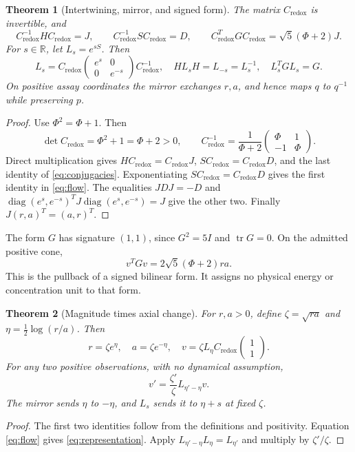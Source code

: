 \documentclass[11pt]{article}
\newtheorem{theorem}{Theorem}
\newcommand{\R}{\mathbb R}
\newcommand{\Id}{I}
\newcommand{\Cr}{C_{\mathrm{redox}}}
\begin{document}
\begin{theorem}[Intertwining, mirror, and signed form]\label{thm:adapter}
The matrix \(\Cr\) is invertible, and
\begin{equation}\label{eq:conjugacies}
 \Cr^{-1}H\Cr=J,\qquad \Cr^{-1}S\Cr=D,\qquad
 \Cr^{T}G\Cr=\sqrt5(\Phi+2)J.
\end{equation}
For \(s\in\R\), let \(L_s=e^{sS}\). Then
\begin{equation}\label{eq:flow}
 L_s=\Cr\begin{pmatrix}e^s&0\\0&e^{-s}\end{pmatrix}\Cr^{-1},
 \quad HL_sH=L_{-s}=L_s^{-1},\quad L_s^TGL_s=G.
\end{equation}
On positive assay coordinates the mirror exchanges \(r,a\), and hence
maps \(q\) to \(q^{-1}\) while preserving \(p\).
\end{theorem}
\begin{proof}
Use \(\Phi^2=\Phi+1\). Then
\[
 \det\Cr=\Phi^2+1=\Phi+2>0,\qquad
 \Cr^{-1}=\frac1{\Phi+2}
   \begin{pmatrix}\Phi&1\\-1&\Phi\end{pmatrix}.
\]
Direct multiplication gives \(H\Cr=\Cr J\), \(S\Cr=\Cr D\),
and the last identity of \eqref{eq:conjugacies}.
Exponentiating \(S\Cr=\Cr D\) gives the first identity in
\eqref{eq:flow}. The equalities \(JDJ=-D\) and
\(\operatorname{diag}(e^s,e^{-s})^T J
\operatorname{diag}(e^s,e^{-s})=J\) give the other two.
Finally \(J(r,a)^T=(a,r)^T\).
\end{proof}

The form \(G\) has signature \((1,1)\), since \(G^2=5\Id\) and
\(\operatorname{tr}G=0\). On the admitted positive cone,
\begin{equation}\label{eq:productmetric}
 v^TGv=2\sqrt5(\Phi+2)ra.
\end{equation}
This is the pullback of a signed bilinear form. It assigns no physical
energy or concentration unit to that form.

\begin{theorem}[Magnitude times axial change]\label{thm:path}
For \(r,a>0\), define \(\zeta=\sqrt{ra}\) and
\(\eta=\tfrac12\log(r/a)\). Then
\begin{equation}\label{eq:representation}
 r=\zeta e^\eta,\quad a=\zeta e^{-\eta},\quad
 v=\zeta L_\eta\Cr\begin{pmatrix}1\\1\end{pmatrix}.
\end{equation}
For any two positive observations, with no dynamical assumption,
\begin{equation}\label{eq:path}
 v'=\frac{\zeta'}{\zeta}L_{\eta'-\eta}v.
\end{equation}
The mirror sends \(\eta\) to \(-\eta\), and \(L_s\) sends it to
\(\eta+s\) at fixed \(\zeta\).
\end{theorem}
\begin{proof}
The first two identities follow from the definitions and positivity.
Equation \eqref{eq:flow} gives \eqref{eq:representation}. Apply
\(L_{\eta'-\eta}L_\eta=L_{\eta'}\) and multiply by
\(\zeta'/\zeta\).
\end{proof}
\end{document}
